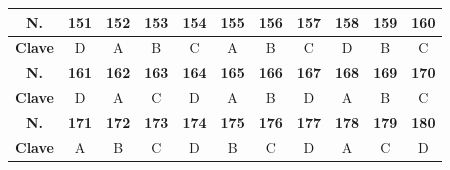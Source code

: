 \begin{center}
\begin{tabular}{|c|c|c|c|c|c|c|c|c|c|c|}
\hline
\textbf{N.} & \textbf{151} & \textbf{152} & \textbf{153} & \textbf{154} & \textbf{155} & \textbf{156} & \textbf{157} & \textbf{158} & \textbf{159} & \textbf{160} \\
\hline
\textbf{Clave} & D & A & B & C & A & B & C & D & B & C \\
\hline
\textbf{N.} & \textbf{161} & \textbf{162} & \textbf{163} & \textbf{164} & \textbf{165} & \textbf{166} & \textbf{167} & \textbf{168} & \textbf{169} & \textbf{170} \\
\hline
\textbf{Clave} & D & A & C & D & A & B & D & A & B & C \\
\hline
\textbf{N.} & \textbf{171} & \textbf{172} & \textbf{173} & \textbf{174} & \textbf{175} & \textbf{176} & \textbf{177} & \textbf{178} & \textbf{179} & \textbf{180} \\
\hline
\textbf{Clave} & A & B & C & D & B & C & D & A & C & D \\
\hline
\end{tabular}
\end{center}
